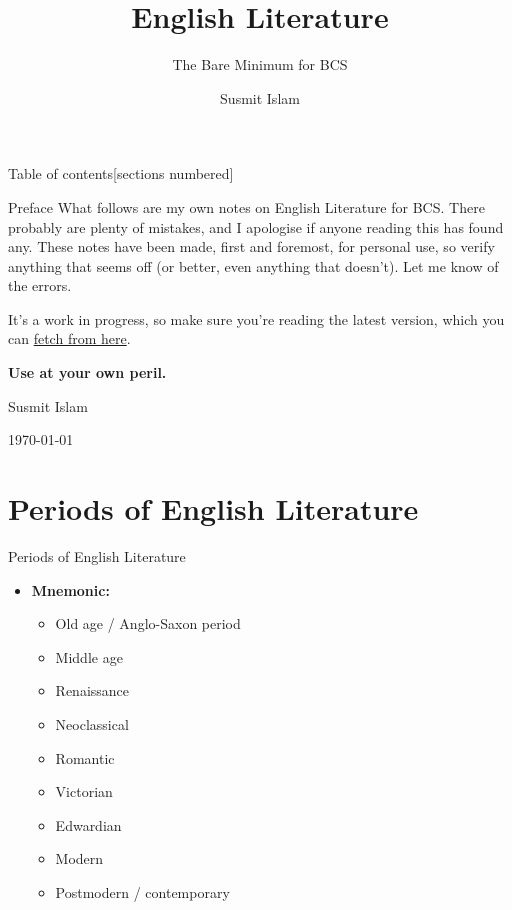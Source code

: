 \documentclass[
  12pt,
    progressbar=frametitle]{beamer}
\title{English Literature}
\subtitle{The Bare Minimum for BCS}
\author{Susmit Islam}
\date{}
\institute{Sir Salimullah Medical College}
\providecommand{\tightlist}{%
  \setlength{\itemsep}{0pt}\setlength{\parskip}{0pt}}
\begin{document}
\frame{\titlepage}
\begin{frame}[t,allowframebreaks]
{Table of contents}[sections numbered]

\tableofcontents[hideallsubsections]
\end{frame}


\begin{frame}[allowframebreaks]
{Preface}
What follows are my own notes on English Literature for BCS. There
probably are plenty of mistakes, and I apologise if anyone reading this
has found any. These notes have been made, first and foremost, for
personal use, so verify anything that seems off (or better, even
anything that doesn't). Let me know of the errors.

It's a work in progress, so make sure you're reading the latest version,
which you can
\href{https://github.com/susmit31/bcs-notes/raw/master/pdfs/lit.pdf}
 {fetch from here}.

\textbf{Use at your own peril.}

\hfill Susmit Islam

\hfill \today
\end{frame}

\section{Periods of English Literature}
\begin{frame}[allowframebreaks]
{Periods of English Literature}
\begin{itemize}
\tightlist
\item
  \textbf{Mnemonic:} 

  \begin{itemize}
  \tightlist
  \item
    Old age / Anglo-Saxon period
  \item
    Middle age
  \item
    Renaissance
  \item
    Neoclassical
  \item
    Romantic
  \item
    Victorian
  \item
    Edwardian
  \item
    Modern
  \item
    Postmodern / contemporary
  \end{itemize}
\end{itemize}
\end{frame}
\end{document}
